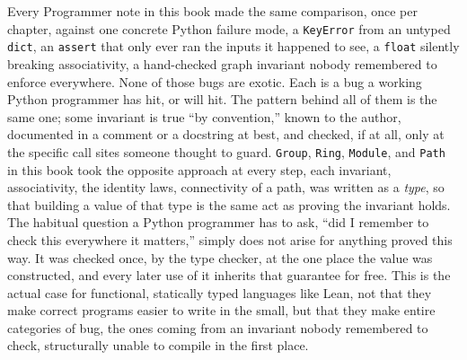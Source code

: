 \begin{progcorner}

Every Programmer note in this book made the same comparison, once per chapter, against one concrete Python failure mode, a \texttt{KeyError} from an untyped \texttt{dict}, an \texttt{assert} that only ever ran the inputs it happened to see, a \texttt{float} silently breaking associativity, a hand-checked graph invariant nobody remembered to enforce everywhere. None of those bugs are exotic. Each is a bug a working Python programmer has hit, or will hit. The pattern behind all of them is the same one; some invariant is true ``by convention,'' known to the author, documented in a comment or a docstring at best, and checked, if at all, only at the specific call sites someone thought to guard. \texttt{Group}, \texttt{Ring}, \texttt{Module}, and \texttt{Path} in this book took the opposite approach at every step, each invariant, associativity, the identity laws, connectivity of a path, was written as a \emph{type}, so that building a value of that type is the same act as proving the invariant holds. The habitual question a Python programmer has to ask, ``did I remember to check this everywhere it matters,'' simply does not arise for anything proved this way. It was checked once, by the type checker, at the one place the value was constructed, and every later use of it inherits that guarantee for free. This is the actual case for functional, statically typed languages like Lean, not that they make correct programs easier to write in the small, but that they make entire categories of bug, the ones coming from an invariant nobody remembered to check, structurally unable to compile in the first place.

\end{progcorner}
